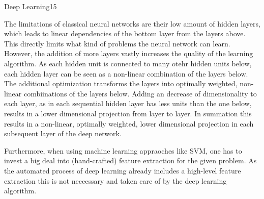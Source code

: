 \begin{questions}
\begin{question}[bonus]{Deep Learning}{15}
\begin{answer}
The limitations of classical neural networks are their low amount of hidden layers, which leads to  linear dependencies of the bottom layer from the layers above. This directly limits what kind of problems the neural network can learn. However, the addition of more layers vastly increases the quality of the learning algorithm. As each hidden unit is connected to many otehr hidden units below, each hidden layer can be seen as a non-linear combination of the layers below. The additional optimization transforms the layers into optimally weighted, non-linear combiinations of the layers below. Adding an decrease of dimensionality to each layer, as in each sequential hidden layer has less units than the one below, results in a lower dimensional projection from layer to layer. In summation this results in a non-linear, optimally weighted, lower dimensional projection in each subsequent layer of the deep network.

Furthermore, when using machine learning appraoches like SVM, one has to invest a big deal into (hand-crafted) feature extraction for the given problem. As the automated process of deep learning already includes a high-level feature extraction this is not neccessary and taken care of by the deep learning algorithm.
\end{answer}

\end{question}


\end{questions}
